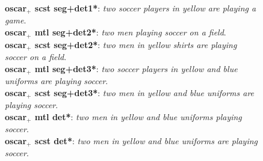 \begin{figure}[H]
{        \textbf{\acrshort{oscar}$_+$ \acrshort{scst} seg+det1*}: \textit{two soccer players in yellow are playing a game}.\\
        \textbf{\acrshort{oscar}$_+$ \acrshort{mtl} seg+det2*}: \textit{two men playing soccer on a field}.\\
        \textbf{\acrshort{oscar}$_+$ \acrshort{scst} seg+det2*}: \textit{two men in yellow shirts are playing soccer on a field}.\\
        \textbf{\acrshort{oscar}$_+$ \acrshort{mtl} seg+det3*}: \textit{two soccer players in yellow and blue uniforms are playing soccer}.\\
        \textbf{\acrshort{oscar}$_+$ \acrshort{scst} seg+det3*}: \textit{two men in yellow and blue uniforms are playing soccer}.\\
        \textbf{\acrshort{oscar}$_+$ \acrshort{mtl} det*}: \textit{two men in yellow and blue uniforms playing soccer}.\\
        \textbf{\acrshort{oscar}$_+$ \acrshort{scst} det*}: \textit{two men in yellow and blue uniforms are playing soccer}.
        }
        \label{fig:test1}
\end{figure}

